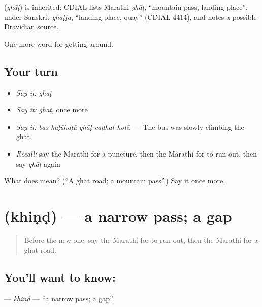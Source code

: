 \begin{cousinweb}
\textbf{} (\emph{ghāṭ}) is inherited: CDIAL lists Marathi \emph{ghāṭ}, \textquotedblleft{}mountain pass, landing place\textquotedblright{}, under Sanskrit \emph{ghaṭṭa}, \textquotedblleft{}landing place, quay\textquotedblright{} (CDIAL 4414), and notes a possible Dravidian source.
\end{cousinweb}

\begin{grammarlens}[title={What you've built}]
One more word for getting around.
\end{grammarlens}

\subsection*{Your turn}
\begin{itemize}
\raggedright
  \item \emph{Say it:} \emph{ghāṭ}
  \item \emph{Say it:} \emph{ghāṭ}, once more
  \item \emph{Say it:} \emph{bas haḷūhaḷū ghāṭ caḍhat hotī.} — The bus was slowly climbing the ghat.
  \item \emph{Recall:} say the Marathi for a puncture, then the Marathi for to run out, then say \emph{ghāṭ} again
\end{itemize}

\begin{tcolorbox}[breakable,colback=teal!4,colframe=teal!35!black,title={Before you move on}]
What does  mean? (\textquotedblleft{}A ghat road; a mountain pass\textquotedblright{}.) Say it once more.
\end{tcolorbox}
\section[\texorpdfstring{\mr{खिंड} (khiṇḍ)}{खिंड (khiṇḍ)}]{ (khiṇḍ) — a narrow pass; a gap}

\label{lesson:MR-C402-khind}



\begin{quote}
Before the new one: say the Marathi for to run out, then the Marathi for a ghat road.
\end{quote}

\subsection*{You'll want to know: }
\textbf{} — \emph{khiṇḍ} — \textquotedblleft{}a narrow pass; a gap\textquotedblright{}.

